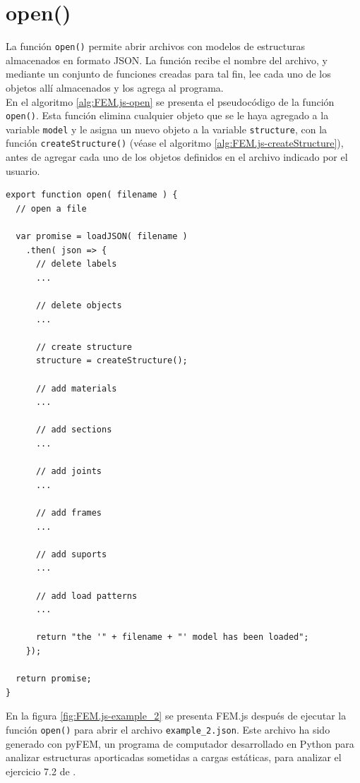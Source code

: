 \section{open()}

La función \verb|open()| permite abrir archivos con modelos de estructuras almacenados en formato JSON. La función recibe el nombre del archivo, y mediante un conjunto de funciones creadas para tal fin, lee cada uno de los objetos allí almacenados y los agrega al programa.\\

En el algoritmo \ref{alg:FEM.js-open} se presenta el pseudocódigo de la función \verb|open()|. Esta función elimina cualquier objeto que se le haya agregado a la variable \verb|model| y le asigna un nuevo objeto a la variable \verb|structure|, con la función \verb|createStructure()| (véase el algoritmo \ref{alg:FEM.js-createStructure}), antes de agregar cada uno de los objetos definidos en el archivo indicado por el usuario.\\

\begin{lstlisting}[language={},caption=Implementación de la función \texttt{open()} del archivo \texttt{FEM.js}.,label=alg:FEM.js-open,frame=single]
export function open( filename ) {
  // open a file

  var promise = loadJSON( filename )
    .then( json => {
      // delete labels
      ...
      
      // delete objects
      ...

      // create structure
      structure = createStructure();
      
      // add materials
      ...

      // add sections
      ...

      // add joints
      ...

      // add frames
      ...

      // add suports
      ...

      // add load patterns
      ...

      return "the '" + filename + "' model has been loaded";
    });

  return promise;
}
\end{lstlisting}
\bigskip

En la figura \ref{fig:FEM.js-example_2} se presenta FEM.js después de ejecutar la función \verb|open()| para abrir el archivo \verb|example_2.json|. Este archivo ha sido generado con pyFEM, un programa de computador desarrollado en Python para analizar estructuras aporticadas sometidas a cargas estáticas, para analizar el ejercicio 7.2 de \cite{escamilla1995microcomputadores}.\\

